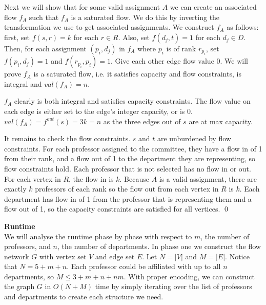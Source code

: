 \documentclass[11pt]{exam}
\begin{document}
Next we will show that for some valid assignment $ A $ we can create
an associated flow $ f_A $ such that $ f_A $ is a saturated flow. We
do this by inverting the transformation we use to get associated
assignments. We construct $ f_A $ as follows: first, set $ f(s, r) =
k $ for each $ r \in R $. Also, set $ f(d_j, t) = 1 $ for each $ d_j
\in D $. Then, for each assignment $ (p_i, d_j) $ in $ f_A $ where $
p_i $ is of rank $ r_{p_i} $, set $ f(p_i, d_j) = 1 $ and $
f(r_{p_i}, p_i) = 1 $. Give each other edge flow value 0. We will
prove $ f_A $ is a saturated flow, i.e. it satisfies capacity and
flow constraints, is integral and $ \mathit{val}(f_A) = n $.

$ f_A $ clearly is both integral and satisfies capacity constraints.
The flow value on each edge is either set to the edge's integer
capacity, or is 0. $ \mathit{val}(f_A) = f^{ \mathit{out}} (s) = 3k =
n$ as the three edges out of $ s $ are at max capacity.

It remains to check the flow constraints. $ s $ and $ t $ are
unburdened by flow constraints. For each professor assigned to the
committee, they have a flow in of 1 from their rank, and a flow out
of 1 to the department they are representing, so flow constraints
hold. Each professor that is not selected has no flow in or out. For
each vertex in $ R $, the flow in is $ k $. Because $ A $ is a valid
assignment, there are exactly $ k $ professors of each rank so the
flow out from each vertex in $ R $ is $ k $. Each department has flow
in of 1 from the professor that is representing them and a flow out
of 1, so the capacity constraints are satisfied for all vertices. \hfill \qed

\vspace{\baselineskip}

\noindent \textbf{Runtime}\\
We will analyse the runtime phase by phase with respect to $ m $, the
number of professors, and $ n $, the number of departments. In phase
one we construct the flow network $ G $ with vertex set $ V $ and
edge set $ E $. Let $ N = |V| $ and $ M = |E| $. Notice that $ N = 5
+ m + n $. Each professor could be affiliated with up to all $ n $
departments, so $ M \leq 3 + m + n + nm $. With proper encoding, we
can construct the graph $ G $ in $O( N + M )$ time by simply
iterating over the list of professors and departments to create each
structure we need.
\end{document}
